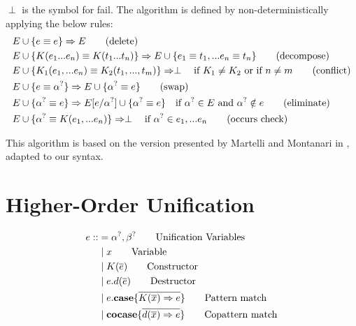 \documentclass[twoside,12pt,a4paper]{article}
\begin{document}
\begin{definition}
    $\perp$ is the symbol for fail.
    The algorithm is defined by non-deterministically applying the below rules:
    \begin{align*}
        E & \cup \{ e \equiv e\} \Rightarrow E \tag{delete}\\
        E & \cup \{K(e_1 ... e_n) \equiv K(t_1 ... t_n)\} \Rightarrow E \cup \{e_1 \equiv t_1, ... e_n \equiv t_n\}\tag{decompose}\\
        E & \cup \{K_1(e_1,...e_n) \equiv K_2(t_1, ..., t_m)\}  \Rightarrow \perp \quad\text{if $K_1 \neq K_2$ or if $n\neq m$} \tag{conflict}\\
        E & \cup \{e \equiv \alpha^?\} \Rightarrow E \cup \{\alpha^? \equiv e\}\tag{swap}\\ 
        E & \cup \{\alpha^? \equiv e\} \Rightarrow E[e/\alpha^?] \cup \{\alpha^? \equiv e\} \quad\text{if $\alpha^? \in E$ and $\alpha^? \notin e$}  \tag{eliminate}\\
        E & \cup \{\alpha^? \equiv K(e_1,...e_n)\}\Rightarrow \perp \quad \text{if $\alpha^? \in e_1,...e_n$} \tag{occurs check} 
    \end{align*}
\end{definition} 

This algorithm is based on the version presented by Martelli and Montanari in \cite{10.1145/357162.357169},
adapted to our syntax.

\section{Higher-Order Unification}

\begin{definition}
    \begin{align*}
        e  ::&= \alpha^?, \beta^? \tag*{Unification Variables}\\ 
            &\;|\; x  \tag*{Variable} \\
            &\;|\;K(\overline{e}) \tag*{Constructor} \\
            &\;|\;e.d(\overline{e})  \tag*{Destructor}\\
            &\;|\;e.\textbf{case}\{\overline{K(\overline{x})\Rightarrow e}\}  \tag*{Pattern match}\\
            &\;|\;\textbf{cocase}\{\overline{d(\overline{x})\Rightarrow e}\}  \tag*{Copattern match}
    \end{align*}
\end{definition}
\end{document}
